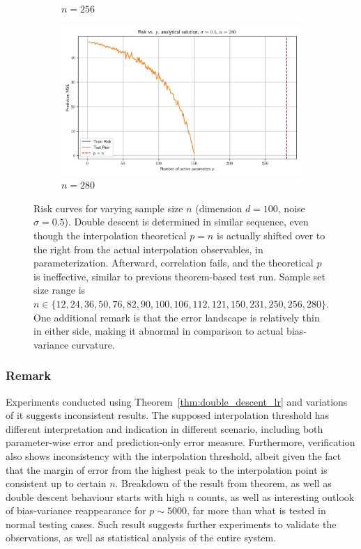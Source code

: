 \documentclass[twoside,10pt]{article}
\begin{document}
\begin{figure}[htb]
\begin{subfigure}[b]{\imgwidth}
    \caption{$n=256$}\label{fig:2o}
  \end{subfigure}%
  \hfill
  \begin{subfigure}[b]{\imgwidth}
    \includegraphics[width=\linewidth]{img2/risk_curve_n280.png}
    \caption{$n=280$}\label{fig:2p}
  \end{subfigure}

  \caption{Risk curves for varying sample size $n$ (dimension $d=100$, noise $\sigma=0.5$). Double descent is determined in similar sequence, even though the interpolation theoretical $p=n$ is actually shifted over to the right from the actual interpolation observables, in parameterization. Afterward, correlation fails, and the theoretical $p$ is ineffective, similar to previous theorem-based test run. Sample set size range is $n\in\{12,24,36,50,76,82,90,100,106,112,121,150,231,250,256,280\}$. One additional remark is that the error landscape is relatively thin in either side, making it abnormal in comparison to actual bias-variance curvature.}
  \label{fig:risk_all_grid}
\end{figure}

\subsubsection{Remark}

Experiments conducted using Theorem~\ref{thm:double_descent_lr} and variations of it suggests inconsistent results. The supposed interpolation threshold has different interpretation and indication in different scenario, including both parameter-wise error and prediction-only error measure. Furthermore, verification also shows inconsistency with the interpolation threshold, albeit given the fact that the margin of error from the highest peak to the interpolation point is consistent up to certain $n$. Breakdown of the result from theorem, as well as double descent behaviour starts with high $n$ counts, as well as interesting outlook of bias-variance reappearance for $p\sim 5000$, far more than what is tested in normal testing cases. Such result suggests further experiments to validate the observations, as well as statistical analysis of the entire system. 
\end{document}
